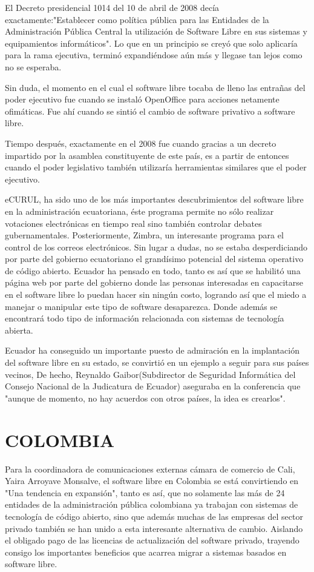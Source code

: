 El Decreto presidencial 1014 del 10 de abril de 2008 decía exactamente:"Establecer como política pública para las Entidades de la Administración Pública Central la utilización 
de Software Libre en sus sistemas y equipamientos informáticos". Lo que en un principio se creyó que solo aplicaría para la rama ejecutiva, terminó expandiéndose aún más y 
llegase tan lejos como no se esperaba.

Sin duda, el momento en el cual el software libre tocaba de lleno las entrañas del poder ejecutivo fue cuando se instaló OpenOffice para acciones netamente ofimáticas. Fue ahí 
cuando se sintió el cambio de software privativo a software libre.

Tiempo después, exactamente en el 2008 fue cuando gracias a un decreto impartido por la asamblea constituyente de este país, es a partir de entonces cuando el poder legislativo 
también utilizaría herramientas similares que el poder ejecutivo.

eCURUL, ha sido uno de los más importantes descubrimientos del software libre en la administración ecuatoriana, éste programa permite no sólo realizar votaciones electrónicas en 
tiempo real sino también controlar debates gubernamentales. Posteriormente, Zimbra, un interesante programa para el control de los correos electrónicos. Sin lugar a dudas, no se 
estaba desperdiciando por parte del gobierno ecuatoriano el grandísimo potencial del sistema operativo de código abierto.
Ecuador ha pensado en todo, tanto es así que se habilitó una página web por parte del gobierno donde las personas interesadas en capacitarse en el software libre lo puedan hacer 
sin ningún costo, logrando así que el miedo a manejar o manipular este tipo de software desaparezca. Donde además se encontrará todo tipo de información relacionada con sistemas 
de tecnología abierta.

Ecuador ha conseguido un importante puesto de admiración en la implantación del software libre en su estado, se convirtió en un ejemplo a seguir para sus países vecinos, De 
hecho, Reynaldo Gaibor(Subdirector de Seguridad Informática del Consejo Nacional de la Judicatura de Ecuador) aseguraba en la conferencia que "aunque de momento, no hay acuerdos 
con otros países, la idea es crearlos".


\section*{COLOMBIA}
Para la coordinadora de comunicaciones externas cámara de comercio de Cali, Yaira Arroyave Monsalve, el software libre en Colombia se está convirtiendo en "Una tendencia en 
expansión",  tanto es así, que no solamente las más de 24 entidades de la administración pública colombiana ya trabajan con sistemas de tecnología de código abierto, sino que 
además muchas de las empresas del sector privado también se han unido a esta interesante alternativa de cambio. Aislando el obligado pago de las licencias de actualización del 
software privado, trayendo consigo los importantes beneficios que acarrea migrar a sistemas basados en software libre.


